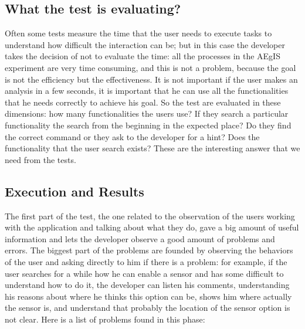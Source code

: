 \subsection{What the test is evaluating?}
Often some tests measure the time that the user needs to execute tasks to understand how difficult the interaction can be; but in this case the developer takes the decision of not to evaluate the time: all the processes in the AEgIS experiment are very time consuming, and this is not a problem, because the goal is not the efficiency but the effectiveness. It is not important if the user makes an analysis in a few seconds, it is important that he can use all the functionalities that he needs correctly to achieve his goal. So the test are evaluated in these dimensions: how many functionalities the users use? If they search a particular functionality the search from the beginning in the expected place? Do they find the correct command or they ask to the developer for a hint? Does the functionality that the user search exists? These are the interesting answer that we need from the tests.  

\subsection{Execution and Results}
The first part of the test, the one related to the observation of the users working with the application and talking about what they do, gave a big amount of useful information and lets the developer observe a good amount of problems and errors. 
The biggest part of the problems are founded by observing the behaviors of the user and asking directly to him if there is a problem: for example, if the user searches for a while how he can enable a sensor and has some difficult to understand how to do it, the developer can listen his comments, understanding his reasons about where he thinks this option can be, shows him where actually the sensor is, and understand that probably the location of the sensor option is not clear. 
Here is a list of problems found in this phase:

